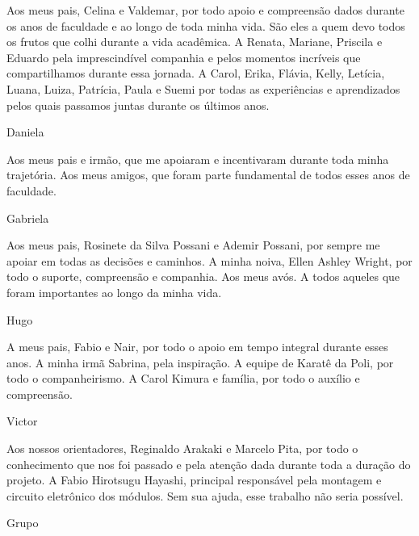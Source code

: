 Aos meus pais, Celina e Valdemar, por todo apoio e compreensão dados durante os anos de faculdade e ao longo de toda minha vida. São eles a quem devo todos os frutos que colhi durante a vida acadêmica.
A Renata, Mariane, Priscila e Eduardo pela imprescindível companhia e pelos momentos incríveis que compartilhamos durante essa jornada.
A Carol, Erika, Flávia, Kelly, Letícia, Luana, Luiza, Patrícia, Paula e Suemi por todas as experiências e aprendizados pelos quais passamos juntas durante os últimos anos.
\begin{flushright}
    Daniela
\end{flushright}

Aos meus pais e irmão, que me apoiaram e incentivaram durante toda minha trajetória. Aos meus amigos, que foram parte fundamental de todos esses anos de faculdade.
\begin{flushright}
    Gabriela
\end{flushright}

Aos meus pais, Rosinete da Silva Possani e Ademir Possani, por sempre me apoiar em todas as decisões e caminhos. A minha noiva, Ellen Ashley Wright, por todo o suporte, compreensão e companhia. Aos meus avós. A todos aqueles que foram importantes ao longo da minha vida.
\begin{flushright}
    Hugo
\end{flushright}

A meus pais, Fabio e Nair, por todo o apoio em tempo integral durante esses anos.
A minha irmã Sabrina, pela inspiração.
A equipe de Karatê da Poli, por todo o companheirismo.
A Carol Kimura e família, por todo o auxílio e compreensão.
\begin{flushright}
    Victor
\end{flushright}

Aos nossos orientadores, Reginaldo Arakaki e Marcelo Pita, por todo o conhecimento que nos foi passado e pela atenção dada durante toda a duração do projeto.
A Fabio Hirotsugu Hayashi, principal responsável pela montagem e circuito eletrônico dos módulos. Sem sua ajuda, esse trabalho não seria possível.
\begin{flushright}
    Grupo
\end{flushright}
